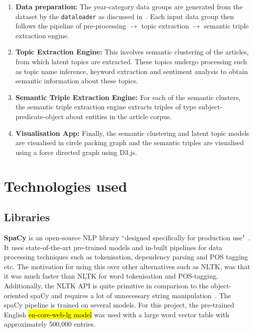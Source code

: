 \begin{enumerate}
    \item \textbf{Data preparation:} The year-category data groups are generated from the dataset by the \texttt{dataloader} as discussed in~. Each input data group then follows the pipeline of pre-processing $\rightarrow$ topic extraction $\rightarrow$ semantic triple extraction engine. 
    
    \item \textbf{Topic Extraction Engine:} This involves semantic clustering of the articles, from which latent topics are extracted. These topics undergo processing such as topic name inference, keyword extraction and sentiment analysis to obtain semantic information about these topics.
    
    \item \textbf{Semantic Triple Extraction Engine:} For each of the semantic  clusters, the semantic triple extraction engine extracts triples of type subject-predicate-object about entities in the article corpus. 
    
    \item \textbf{Visualisation App:} Finally, the semantic clustering and latent topic models are visualised in circle packing graph and the semantic triples are visualised using a force directed graph using D3.js. 
    

\end{enumerate}
\section{Technologies used}
\vspace{-1ex}
\subsection{Libraries} \label{libraries}

\textbf{SpaCy} is an open-source NLP library ``designed specifically for production use"~\cite{spacy}. It uses state-of-the-art pre-trained models and in-built pipelines for data processing techniques such as tokenisation, dependency parsing and POS tagging etc. The motivation for using this over other alternatives such as NLTK, was that it was much faster than NLTK for word tokenisation and POS-tagging. Additionally, the NLTK API is quite primitive in comparison to the object-oriented spaCy and requires a lot of unnecessary string manipulation~\cite{spacy-nltk}. The spaCy pipeline is trained on several models. For this project, the pre-trained English \hl{en-core-web-lg model} was used with a large word vector table with approximately 500,000 entries.  

